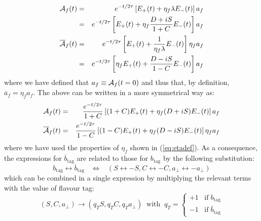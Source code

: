 \documentclass[a4paper,9pt,twosided]{article}
\begin{document}
\begin{eqnarray}
   {\cal A}_f(t)            &=& e^{-t/2\tau} \left[ E_+(t) + \eta_f \lambda E_-(t)  \right] a_f  \\
                            &=&     e^{-t/2\tau} \left[ E_+(t) +\eta_f \frac{D+iS}{1+C} E_-(t)  \right] a_f  \\
   {\overline{\cal A}}_f(t) &=& e^{-t/2\tau} \left[  E_+(t) + \frac{1}{\eta_f\lambda} E_-(t)  \right] \eta_f a_f    \\
                            &=&     e^{-t/2\tau} \left[\eta_f E_+(t) + \frac{D-iS}{1-C} E_-(t)  \right] a_f   
\end{eqnarray}
where we have defined that $a_f \equiv {\cal A}_f(t=0)$ and thus that, by definition, $\overline{a}_f = \eta_f a_f$. The above can be
written in a more symmetrical way as:
\begin{eqnarray}
   {\cal A}_f(t)           &=&     \frac{e^{-t/2\tau}}{1+C} \left[ (1+C)E_+(t) +\eta_f (D+iS) E_-(t)  \right] a_f  
\\   {\overline{\cal A}}_f(t) &=&    \frac{e^{-t/2\tau}}{1-C} \left[ (1-C)E_+(t) +\eta_f (D-iS) E_-(t)  \right] \eta_f a_f  
\end{eqnarray}
where we have used the properties of $\eta_f$ shown in (\ref{eq:etadef}).
As a consequence, the expressions for $\overline{b}_\mathrm{tag}$ are related to those for $b_\mathrm{tag}$ by the following substitution:
\begin{equation}
b_\mathrm{tag} \leftrightarrow \overline{b}_\mathrm{tag} \;\;\;\Leftrightarrow\;\;\;  ( S \leftrightarrow -S, C\leftrightarrow -C, a_\perp\leftrightarrow -a_\perp ) 
\end{equation}
which can be combined in a single expression by multiplying the relevant terms with the value of flavour tag:
\begin{equation}
(S,C,a_\perp) \rightarrow (q_T S, q_T C, q_Ta_\perp) \;\; \mathrm{with}\;\; q_T = \left\{\begin{array}{l} +1 \;\;\; \mathrm{if}\; b_\mathrm{tag} \\
                                                                                   -1 \;\;\; \mathrm{if}\; \overline{b}_\mathrm{tag}
\end{array} \right.
\end{equation}
\end{document}
